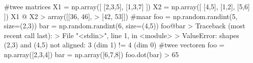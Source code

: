 \begin{python}
#twee matrices
X1 = np.array([ [2,3,5], [1,3,7] ])
X2 = np.array([ [4,5], [1,2], [5,6] ])
X1 @ X2
> array([[36, 46],
>       [42, 53]])
#maar
foo = np.random.randint(5, size=(2,3))
bar = np.random.randint(6, size=(4,5))
foo@bar
> Traceback (most recent call last):
>  File "<stdin>", line 1, in <module>
>  ValueError: shapes (2,3) and (4,5) not aligned: 3 (dim 1) != 4 (dim 0)
#twee vectoren
foo = np.array([2,3,4])
bar = np.array([6,7,8])
foo.dot(bar)
> 65
\end{python}
